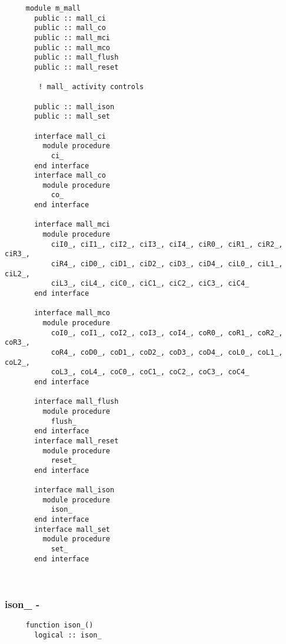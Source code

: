 \begin{verbatim} 
     module m_mall
       public :: mall_ci
       public :: mall_co
       public :: mall_mci
       public :: mall_mco
       public :: mall_flush
       public :: mall_reset
 
 		! mall_ activity controls
 
       public :: mall_ison
       public :: mall_set
 
       interface mall_ci
         module procedure 
           ci_
       end interface
       interface mall_co
         module procedure 
           co_
       end interface
 
       interface mall_mci
         module procedure
           ciI0_, ciI1_, ciI2_,	ciI3_, ciI4_, ciR0_, ciR1_, ciR2_, ciR3_, 
           ciR4_, ciD0_, ciD1_, ciD2_, ciD3_, ciD4_, ciL0_, ciL1_, ciL2_, 
           ciL3_, ciL4_, ciC0_, ciC1_, ciC2_, ciC3_, ciC4_
       end interface
 
       interface mall_mco
         module procedure
           coI0_, coI1_, coI2_, coI3_, coI4_, coR0_, coR1_, coR2_, coR3_, 
           coR4_, coD0_, coD1_, coD2_, coD3_, coD4_, coL0_, coL1_, coL2_, 
           coL3_, coL4_, coC0_, coC1_, coC2_, coC3_, coC4_
       end interface
 
       interface mall_flush
         module procedure 
           flush_
       end interface
       interface mall_reset
         module procedure 
           reset_
       end interface
 
       interface mall_ison
         module procedure 
           ison_
       end interface
       interface mall_set
         module procedure 
           set_
       end interface
 \end{verbatim}%
 
 
\mbox{}\hrulefill\ 
 
  \subsubsection{ison\_ -}

\begin{verbatim} 
     function ison_()
       logical :: ison_
 \end{verbatim}%
 
